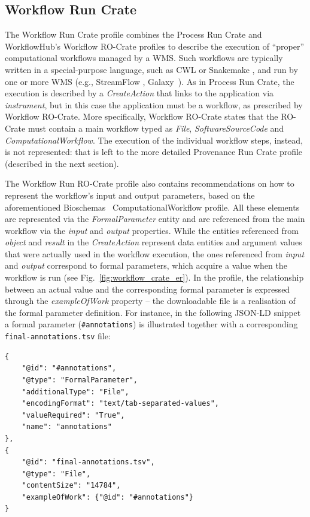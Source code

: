 \documentclass[10pt,letterpaper]{article}
\begin{document}
\subsection{Workflow Run Crate}\label{workflow-run-crate}

The Workflow Run Crate profile \cite{WRROC 2023b} combines the Process Run Crate and WorkflowHub's Workflow RO-Crate \cite{Bacall 2022} profiles to describe the execution of “proper” computational workflows managed by a WMS.
Such workflows are typically written in a special-purpose language, such as CWL or Snakemake
\cite{Koster 2012}, and run by one or more WMS (e.g., StreamFlow \cite{Colonnelli 2021}, Galaxy~\cite{Galaxy 2022}).
As in Process Run Crate, the execution is described by a \emph{CreateAction}
that links to the application via \emph{instrument}, but in this case the application must be a workflow, as prescribed by Workflow RO-Crate.
More specifically, Workflow RO-Crate states that the RO-Crate must contain a main workflow typed as \emph{File}, \emph{SoftwareSourceCode}
and \emph{ComputationalWorkflow}.
The execution of the individual workflow steps, instead, is not represented: that is left to the more detailed Provenance Run Crate profile (described in the next section).

The Workflow Run RO-Crate profile also contains recommendations on how to represent the workflow's input and output parameters, based on the aforementioned Bioschemas~\cite{Gray 2017} ComputationalWorkflow profile.
All these elements are represented via the \emph{FormalParameter} entity and are referenced from the main workflow via the \emph{input} and
\emph{output} properties.
While the entities referenced from
\emph{object} and \emph{result} in the \emph{CreateAction} represent data entities and argument values that were actually used in the workflow execution, the ones referenced from \emph{input} and
\emph{output} correspond to formal parameters, which acquire a value when the workflow is run (see Fig.~\ref{fig:workflow_crate_er}).
In the profile, the relationship between an actual value and the corresponding formal parameter is expressed through the \emph{exampleOfWork} property -- the downloadable file is a realisation of the formal parameter definition.
For instance, in the following JSON-LD snippet a formal parameter (\texttt{\#annotations}) is illustrated together with a corresponding \texttt{final-annotations.tsv} file:

\begin{verbatim}
{
    "@id": "#annotations",
    "@type": "FormalParameter",
    "additionalType": "File",
    "encodingFormat": "text/tab-separated-values",
    "valueRequired": "True",
    "name": "annotations"
},
{
    "@id": "final-annotations.tsv",
    "@type": "File",
    "contentSize": "14784",
    "exampleOfWork": {"@id": "#annotations"}
}
\end{verbatim}
\end{document}
